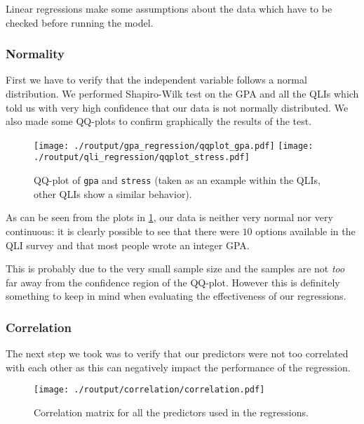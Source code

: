 \documentclass[11pt]{extarticle}
\numberwithin{table}{section}
\numberwithin{figure}{section}
\numberwithin{equation}{section}
\begin{document}
Linear regressions make some assumptions about the data which have to be checked before
running the model.

\subsubsection{Normality}

First we have to verify that the independent variable follows a normal distribution.
We performed Shapiro-Wilk test on the GPA and all the QLIs which told us
with very high confidence that our data is not normally distributed.
We also made some QQ-plots to confirm graphically the results of the test.

\begin{figure}[!ht]
	\centering
	{\texttt{[image: ./routput/gpa\_regression/qqplot\_gpa.pdf]}}
	\hspace{1cm}
	{\texttt{[image: ./routput/qli\_regression/qqplot\_stress.pdf]}}
	\caption{QQ-plot of \texttt{gpa} and \texttt{stress}
		(taken as an example within the QLIs, other QLIs show a similar behavior).
	}
	\label{fig:qq-gpa-stress}
\end{figure}

As can be seen from the plots in \cref{fig:qq-gpa-stress},
our data is neither very normal nor very continuous:
it is clearly possible to see that there were $10$ options available in the QLI survey
and that most people wrote an integer GPA.

This is probably due to the very small sample size
and the samples are not \textit{too} far away from the confidence region of the QQ-plot.
However this is definitely something to keep in mind when
evaluating the effectiveness of our regressions.

\subsubsection{Correlation}
\label{sec:correlation}

The next step we took was to verify that our predictors
were not too correlated with each other as this can negatively impact the performance
of the regression.

\begin{figure}[!ht]
	\centering
	\texttt{[image: ./routput/correlation/correlation.pdf]}
	\caption{Correlation matrix for all the predictors used in the regressions.}
	\label{fig:corr}
\end{figure}
\end{document}
